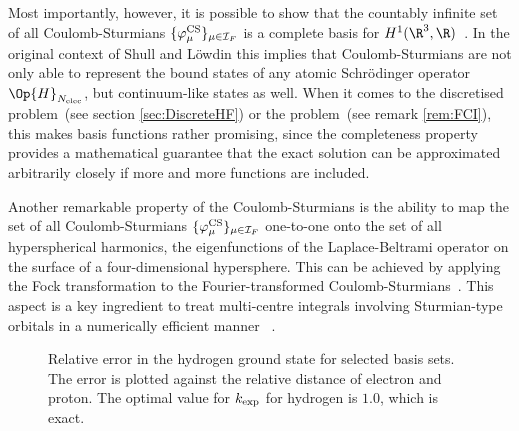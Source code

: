 Most importantly, however, it is possible to show
that the countably infinite set of all Coulomb-Sturmians $\{\varphi^\text{CS}_\mu\}_{\mu\in\mathcal{I}_F}$
is a complete basis for $H^1(\R^3, \R)$~\cite[Theorem 2.3.4]{Avery2008}.
In the original context of Shull and Löwdin this implies that Coulomb-Sturmians
are not only able to represent the bound states
of any atomic Schrödinger operator $\Op{H}_{\Nelec}$,
but continuum-like states as well.
When it comes to the discretised \HF problem~(see section \ref{sec:DiscreteHF})
or the \FCI problem~(see remark \ref{rem:FCI}),
this makes \CS basis functions rather promising,
since the completeness property
provides a mathematical guarantee that the exact solution can be approximated
arbitrarily closely
if more and more \CS functions are included.

Another remarkable property of the Coulomb-Sturmians
is the ability to map the set of all Coulomb-Sturmians
$\{ \varphi^\text{CS}_\mu\}_{\mu\in\mathcal{I}_F}$
one-to-one onto the set of all hyperspherical harmonics,
the eigenfunctions of the Laplace-Beltrami operator
on the surface of a four-dimensional hypersphere.
This can be achieved by applying the Fock transformation
to the Fourier-transformed Coulomb-Sturmians~\cite{Avery2006}.
This aspect is a key ingredient to treat multi-centre integrals
involving Sturmian-type orbitals in a numerically efficient manner%
~\cite{Aquilanti1996,Aquilanti1997,Aquilanti2001,Morales2016,Avery2015,Avery2017}.

\begin{figure}[t]
	\centering
	\caption[
		Relative error in the hydrogen ground state
		for selected \CS basis sets
	]
	{Relative error in the hydrogen ground state
		for selected \CS basis sets.
		The error is plotted against
		the relative distance of electron and proton.
		The optimal value for $k_\text{exp}$ for hydrogen is $1.0$,
		which is exact.
	}
	\label{fig:RelativeErrorCS}
\end{figure}

